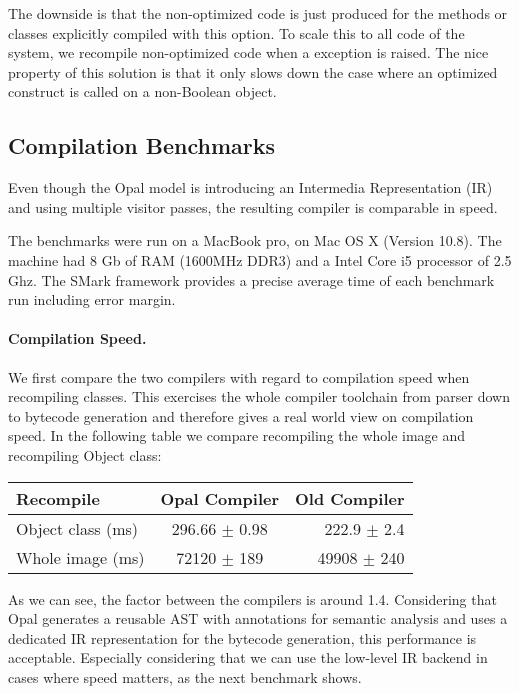 \documentclass[preprint,10pt]{sigplanconf}
\begin{document}
The downside is that the non-optimized code is just produced for the methods or classes explicitly compiled with this option. To scale this to all code of the system, we recompile non-optimized code when a  exception is raised. The nice property of this solution is that it only slows down the case where an optimized construct is called on a non-Boolean object. 

\subsection{Compilation Benchmarks}\label{sec:bench}

Even though the Opal model is introducing an Intermedia Representation (IR) and using multiple visitor passes, the resulting compiler is comparable in speed.

The benchmarks were run on a MacBook pro, on Mac OS X (Version 10.8). The machine had 8 Gb of RAM (1600MHz DDR3) and a Intel Core i5 processor of 2.5 Ghz. The SMark framework provides a precise average time of each benchmark run including error margin.

\paragraph{Compilation Speed.}

We first compare the two compilers with regard to compilation speed when recompiling classes. This exercises the whole compiler toolchain from parser down to bytecode generation and therefore gives a real world view on compilation speed. In the following table we compare recompiling the whole image and recompiling Object class:
\vspace{0.2cm}
\begin{center}
\begin{tabular}{|l|c|r|}
  \hline
  Recompile & Opal Compiler & Old Compiler  \\
  \hline
  Object class  (ms) & 296.66 $\pm$ 0.98 & 222.9 $\pm$ 2.4 \\
  Whole image  (ms)  & 72120 $\pm$ 189   & 49908 $\pm$ 240 \\
  \hline
\end{tabular}
\end{center}

As we can see, the factor between the compilers is around 1.4. Considering that Opal generates a reusable AST with annotations for semantic analysis and uses
a dedicated IR representation for the bytecode generation, this performance is acceptable. Especially considering that we can use the low-level IR backend
in cases where speed matters, as the next benchmark shows.
\end{document}
